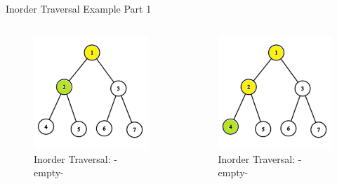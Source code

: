 \documentclass[aspectratio=169]{beamer}%
\begin{document}
\begin{frame}{Inorder Traversal Example Part 1}
\begin{columns}
\begin{column}{0.32\textwidth}
\begin{figure}
                \includegraphics[width = .9\linewidth]{tree-in 2.png}
                \caption{Inorder Traversal: -empty-}
            \end{figure}
        \end{column}
        \hfill
        \begin{column}{0.32\textwidth}
            \begin{figure}
                \centering
                \includegraphics[width = .9\linewidth]{tree-in 3.png}
                \caption{Inorder Traversal: -empty-}
            \end{figure}
        \end{column}
    \end{columns}
\end{frame}
\end{document}
